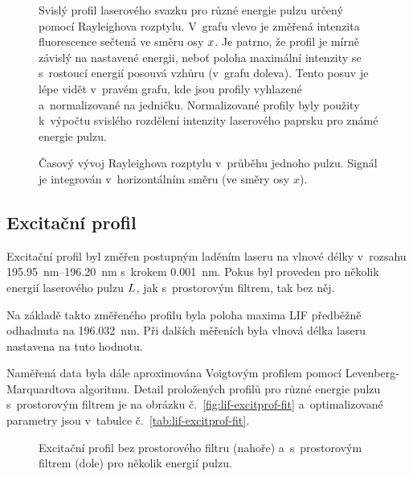 \begin{figure}
	\centering
	\hfill
	
	\caption{Svislý profil laserového svazku pro různé energie pulzu
		určený pomocí Rayleighova rozptylu.
		V~grafu vlevo je změřená intenzita fluorescence sečtená
		ve směru osy $x$.
		Je patrno, že profil je mírně závislý na nastavené energii,
		neboť poloha maximální intenzity se s~rostoucí energií posouvá
		vzhůru (v~grafu doleva).
		Tento posuv je lépe vidět v~pravém grafu, kde jsou profily
		vyhlazené a~normalizované na jedničku.
		Normalizované profily byly použity k~výpočtu svislého
		rozdělení intenzity laserového paprsku pro známé energie pulzu.}
	\label{fig:lif-rayleigh-profile}
\end{figure}

\begin{figure}
	\centerline{}
	\caption{Časový vývoj Rayleighova rozptylu v~průběhu jednoho pulzu.
		Signál je integrován v~horizontálním směru (ve směry osy $x$).}
	\label{fig:lif-rayleigh-time}
\end{figure}

\subsection{Excitační profil}
\label{sec:lif-excitprof}
Excitační profil byl změřen postupným laděním laseru na vlnové délky
v~rozsahu \SIrange{195.95}{196.20}{\nano\metre}
s~krokem \SI{0.001}{\nano\metre}.
Pokus byl proveden pro několik energií laserového pulzu $L$,
jak s~prostorovým filtrem, tak bez něj.

Na základě takto změřeného profilu byla poloha maxima LIF předběžně
odhadnuta na \SI{196.032}{\nano\metre}.
Při dalších měřeních byla vlnová délka laseru na\-stavena na tuto hodnotu.

Naměřená data byla dále aproximována Voigtovým profilem pomocí
Le\-ven\-berg-Marquardtova algoritmu.
Detail proložených profilů pro různé energie pulzu s~prostorovým filtrem
je na obrázku č.~\ref{fig:lif-excitprof-fit}
a~optimalizované parametry jsou v~tabulce č.~\ref{tab:lif-excitprof-fit}.

\begin{figure}
	\centering
	
	\bigskip\par
	
	\caption{Excitační profil bez prostorového filtru (nahoře)
		a~s~prostorovým filtrem (dole) pro několik energií pulzu.}
	\label{fig:lif-excitprof-filter}
\end{figure}


